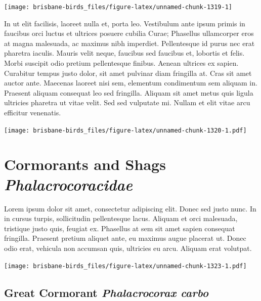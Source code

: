 \documentclass[]{book}
\let\origfigure\figure
\let\endorigfigure\endfigure
\renewenvironment{figure}[1][2] {
  \expandafter\origfigure\expandafter[H]
} {
  \endorigfigure
}
\begin{document}
\begin{figure}
\texttt{[image: brisbane-birds\_files/figure-latex/unnamed-chunk-1319-1]} \caption{insert figure caption}\label{fig:unnamed-chunk-1319}
\end{figure}

In ut elit facilisis, laoreet nulla et, porta leo. Vestibulum ante ipsum
primis in faucibus orci luctus et ultrices posuere cubilia Curae;
Phasellus ullamcorper eros at magna malesuada, ac maximus nibh
imperdiet. Pellentesque id purus nec erat pharetra iaculis. Mauris velit
neque, faucibus sed faucibus et, lobortis et felis. Morbi suscipit odio
pretium pellentesque finibus. Aenean ultrices ex sapien. Curabitur
tempus justo dolor, sit amet pulvinar diam fringilla at. Cras sit amet
auctor ante. Maecenas laoreet nisi sem, elementum condimentum sem
aliquam in. Praesent aliquam consequat leo sed fringilla. Aliquam sit
amet metus quis ligula ultricies pharetra ut vitae velit. Sed sed
vulputate mi. Nullam et elit vitae arcu efficitur venenatis.

\begin{figure}
\centering
\texttt{[image: brisbane-birds\_files/figure-latex/unnamed-chunk-1320-1.pdf]}
\caption{\label{fig:unnamed-chunk-1320}insert figure caption}
\end{figure}

\chapter{\texorpdfstring{Cormorants and Shags
\emph{Phalacrocoracidae}}{Cormorants and Shags Phalacrocoracidae}}\label{cormorants-and-shags-phalacrocoracidae}

Lorem ipsum dolor sit amet, consectetur adipiscing elit. Donec sed justo
nunc. In in cursus turpis, sollicitudin pellentesque lacus. Aliquam et
orci malesuada, tristique justo quis, feugiat ex. Phasellus at sem sit
amet sapien consequat fringilla. Praesent pretium aliquet ante, eu
maximus augue placerat ut. Donec odio erat, vehicula non accumsan quis,
ultricies eu arcu. Aliquam erat volutpat.

\texttt{[image: brisbane-birds\_files/figure-latex/unnamed-chunk-1323-1.pdf]}

\section{\texorpdfstring{Great Cormorant \emph{Phalacrocorax
carbo}}{Great Cormorant Phalacrocorax carbo}}\label{great-cormorant-phalacrocorax-carbo}
\end{document}
